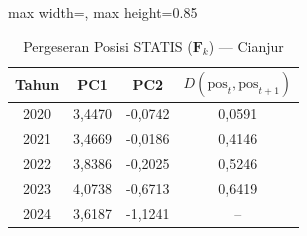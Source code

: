 \begin{table}[H]
\centering
\caption{Pergeseran Posisi STATIS ($\mathbf{F}_k$) --- Cianjur} \label{tab:app2jarak_statis_skor_cianjur}
\begin{adjustbox}{max width=\textwidth, max height=0.85\textheight}
\begin{tabular}{|c|c|c|c|}
\hline
\textbf{Tahun} & \textbf{PC1} & \textbf{PC2} & \textbf{$D(\text{pos}_t, \text{pos}_{t+1})$} \\
\hline
2020 & 3,4470 & -0,0742 & 0,0591 \\
2021 & 3,4669 & -0,0186 & 0,4146 \\
2022 & 3,8386 & -0,2025 & 0,5246 \\
2023 & 4,0738 & -0,6713 & 0,6419 \\
2024 & 3,6187 & -1,1241 & -- \\
\hline
\end{tabular}
\end{adjustbox}
\end{table}